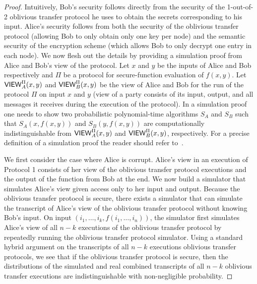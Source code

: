 \begin{proof} 


Intuitively, Bob's security follows directly from the security of the
1-out-of-2 oblivious transfer protocol he uses to obtain the secrets
corresponding to his input. Alice's security follows from both the
security of the oblivious transfer protocol (allowing Bob to only
obtain only one key per node) and the semantic security of the
encryption scheme (which allows Bob to only decrypt one entry in each
node). We now flesh out the details by providing a simulation proof
from Alice and Bob's view of the protocol. Let $x$ and $y$ be the
inputs of Alice and Bob respectively and $\Pi$ be a protocol for
secure-function evaluation of $f(x,y)$.  Let ${\sf VIEW}_A^\Pi (x,y)$
and ${\sf VIEW}_B^\Pi (x,y)$ be the view of Alice and Bob for the run
of the protocol $\Pi$ on input $x$ and $y$ (view of a party consists
of its input, output, and all messages it receives during the
execution of the protocol). In a simulation proof one needs to show
two probabilistic polynomial-time algorithms $S_A$ and $S_B$ such that
$S_A (x,f(x,y))$ and $S_B (y,f(x,y))$ are computationally
indistinguishable from ${\sf VIEW}_A^\Pi (x,y)$ and ${\sf VIEW}_B^\Pi
(x,y)$, respectively.  For a precise definition of a simulation proof
the reader should refer to~\cite[Chapter 7]{Goldreich:vol2}.

We first consider the case where Alice is corrupt. Alice's view in an
execution of Protocol 1 consists of her view of the oblivious transfer
protocol executions and the output of the function from Bob at the
end. We now build a simulator that simulates Alice's view given access
only to her input and output. Because the oblivious transfer protocol
is secure, there exists a simulator that can simulate the transcript
of Alice's view of the oblivious transfer protocol without knowing
Bob's input. On input $(i_1,\ldots,i_k, f(i_1,\ldots,i_n))$, the
simulator first simulates Alice's view of all $n-k$ executions of the
oblivious transfer protocol by repeatedly running the oblivious
transfer protocol simulator. Using a standard hybrid argument on the
transcripts of all $n-k$ executions oblivious transfer protocols, we
see that if the oblivious transfer protocol is secure, then the
distributions of the simulated and real combined transcripts of all
$n-k$ oblivious transfer executions are indistinguishable with
non-negligible probability.


\end{proof}
